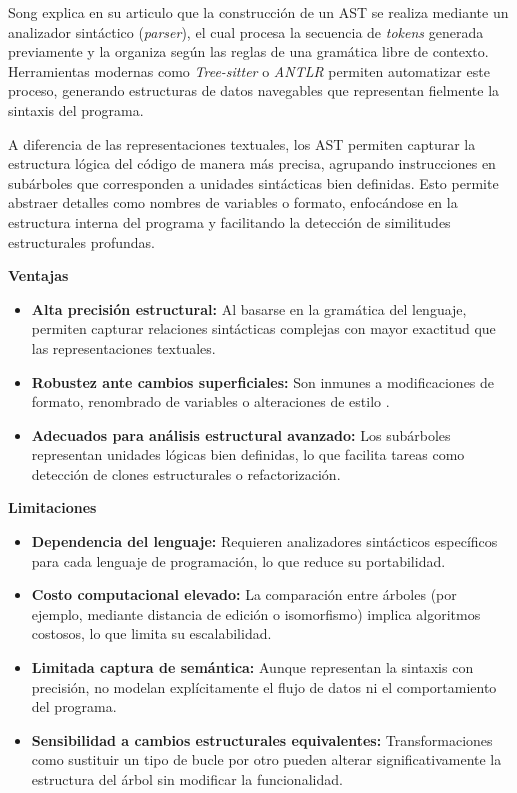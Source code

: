 Song \cite{Song2024AST} explica en su articulo que la construcción de un AST se realiza mediante un analizador sintáctico (\textit{parser}), el cual procesa la secuencia de \textit{tokens} generada previamente y la organiza según las reglas de una gramática libre de contexto. Herramientas modernas como \textit{Tree-sitter} o \textit{ANTLR} permiten automatizar este proceso, generando estructuras de datos navegables que representan fielmente la sintaxis del programa.

A diferencia de las representaciones textuales, los AST permiten capturar la estructura lógica del código de manera más precisa, agrupando instrucciones en subárboles que corresponden a unidades sintácticas bien definidas\cite{Pradeep2025AntiPlagiarism}. Esto permite abstraer detalles como nombres de variables o formato, enfocándose en la estructura interna del programa y facilitando la detección de similitudes estructurales profundas.

\textbf{Ventajas}
\begin{itemize}
    \item \textbf{Alta precisión estructural:} Al basarse en la gramática del lenguaje, permiten capturar relaciones sintácticas complejas con mayor exactitud que las representaciones textuales.
    
    \item \textbf{Robustez ante cambios superficiales:} Son inmunes a modificaciones de formato, renombrado de variables o alteraciones de estilo \cite{Pradeep2025AntiPlagiarism}.
    
    \item \textbf{Adecuados para análisis estructural avanzado:} Los subárboles representan unidades lógicas bien definidas, lo que facilita tareas como detección de clones estructurales o refactorización\cite{Roy2007Survey}.
\end{itemize}

\textbf{Limitaciones}
\begin{itemize}
    \item \textbf{Dependencia del lenguaje:} Requieren analizadores sintácticos específicos para cada lenguaje de programación, lo que reduce su portabilidad\cite{Roy2007Survey}.
    
    \item \textbf{Costo computacional elevado:} La comparación entre árboles (por ejemplo, mediante distancia de edición o isomorfismo) implica algoritmos costosos, lo que limita su escalabilidad\cite{Pradeep2025AntiPlagiarism}.
    
    \item \textbf{Limitada captura de semántica:} Aunque representan la sintaxis con precisión, no modelan explícitamente el flujo de datos ni el comportamiento del programa.
    
    \item \textbf{Sensibilidad a cambios estructurales equivalentes:} Transformaciones como sustituir un tipo de bucle por otro pueden alterar significativamente la estructura del árbol sin modificar la funcionalidad\cite{Roy2007Survey}.
\end{itemize}

